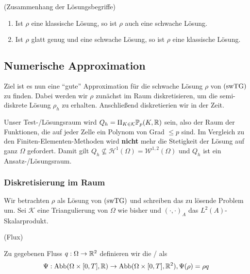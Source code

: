 \begin{Lemma}(Zusammenhang der Lösungsbegriffe)
	
	\begin{enumerate}
		\item Ist $ \rho $ eine klassische Lösung, so ist $ \rho $ auch eine schwache Lösung.
		\item Ist $ \rho $ glatt genug und eine schwache Lösung, so ist $ \rho $ eine klassische Lösung. 
	\end{enumerate}
\end{Lemma}



\subsection{Numerische Approximation}
Ziel ist es nun eine \enquote{gute} Approximation für die schwache Lösung $ \rho $ von $ \operatorname{(swTG)} $ zu finden. Dabei werden wir $ \rho $ zunächst im Raum diskretisieren,  um die semi-diskrete Lösung $ \rho_h $ zu erhalten. Anschließend diskretierien wir in der Zeit.

Unser  Test-/Lösungsraum wird $Q_h = \Pi_{K \in \mathcal{K}}  \mathbb{P}_p(K,\mathbb{R}) $ sein, also der Raum der Funktionen, die auf jeder Zelle ein Polynom von Grad $ \leq p $ sind. Im Vergleich zu den Finiten-Elementen-Methoden wird \textbf{nicht} mehr die Stetigkeit der Lösung auf ganz $ \Omega $ gefordert. Damit gilt $ Q_h \not \subseteq \mathcal{H}^1(\Omega)=\mathcal{W}^{1,2}(\Omega) $ und $ Q_h $ ist ein  Ansatz-/Lösungsraum.

\subsubsection{Diskretisierung im Raum}
Wir betrachten $ \rho $ als Lösung von $ \operatorname{(swTG)} $ und schreiben das zu lösende Problem um. Sei $ \mathcal{K} $ eine Triangulierung von $ \Omega $ wie bisher und $ (\cdot,\cdot)_A $ das $ L^2(A) $-Skalarprodukt. 
\begin{define}(Flux)
	
	Zu gegebenen Fluss $ q:\Omega \to \mathbb{R}^2 $ definieren wir die / als
	\[ \Psi: \operatorname{Abb}(\Omega \times [0,T], \mathbb{R}) \to \operatorname{Abb}(\Omega \times [0,T], \mathbb{R}^2), \Psi(\rho) = \rho q \]
\end{define}

